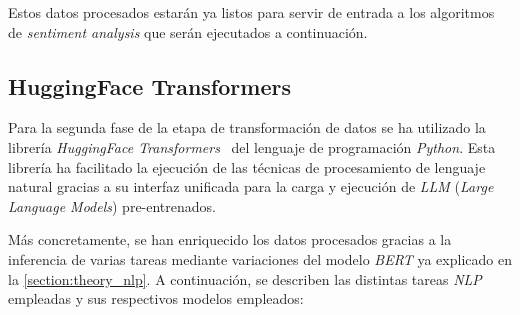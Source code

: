 Estos datos procesados estarán ya listos para servir de entrada a los algoritmos de \textit{sentiment analysis} que serán ejecutados a continuación.

\subsection{HuggingFace Transformers}

Para la segunda fase de la etapa de transformación de datos se ha utilizado la librería \textit{HuggingFace Transformers}~\cite{huggingfaceTransformers} del lenguaje de programación \textit{Python}. Esta librería ha facilitado la ejecución de las técnicas de procesamiento de lenguaje natural gracias a su interfaz unificada para la carga y ejecución de \textit{LLM} (\textit{Large Language Models}) pre-entrenados.

Más concretamente, se han enriquecido los datos procesados gracias a la inferencia de varias tareas mediante variaciones del modelo \textit{BERT} ya explicado en la \autoref{section:theory_nlp}. A continuación, se describen las distintas tareas \textit{NLP} empleadas y sus respectivos modelos empleados:

